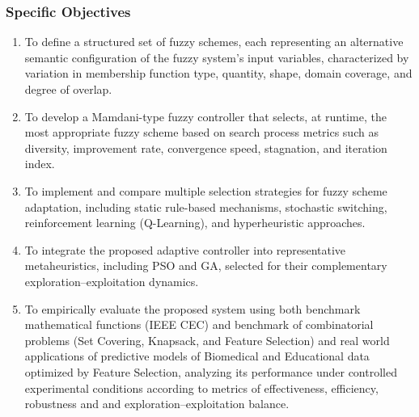 \subsubsection{Specific Objectives}
\begin{enumerate}
    \item To define a structured set of fuzzy schemes, each representing an alternative semantic configuration of the fuzzy system’s input variables, characterized by variation in membership function type, quantity, shape, domain coverage, and degree of overlap.
    \item To develop a Mamdani-type fuzzy controller that selects, at runtime, the most appropriate fuzzy scheme based on search process metrics such as diversity, improvement rate, convergence speed, stagnation, and iteration index.
    \item To implement and compare multiple selection strategies for fuzzy scheme adaptation, including static rule-based mechanisms, stochastic switching, reinforcement learning (Q-Learning), and hyperheuristic approaches.
    \item To integrate the proposed adaptive controller into representative metaheuristics, including PSO and GA, selected for their complementary exploration–exploitation dynamics.
    \item To empirically evaluate the proposed system using both benchmark mathematical functions (IEEE CEC) and benchmark of combinatorial problems (Set Covering, Knapsack, and Feature Selection) and real world applications of predictive models of Biomedical and Educational data optimized by Feature Selection, analyzing its performance under controlled experimental conditions according to metrics of effectiveness, efficiency, robustness and and exploration–exploitation balance.
\end{enumerate}
